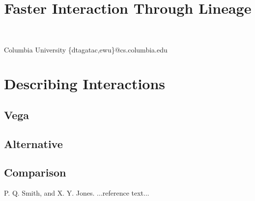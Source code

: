 \documentclass{sigplanconf}
\begin{document}
\setlength{\pdfpageheight}{\paperheight}
\setlength{\pdfpagewidth}{\paperwidth}


\title{Faster Interaction Through Lineage}

           {Columbia University}
           {\{dtagatac,ewu\}@cs.columbia.edu}

\maketitle



\section{Describing Interactions}
\subsection{Vega}
\subsection{Alternative}
\subsection{Comparison}


\begin{thebibliography}{}
\softraggedright
{}
P. Q. Smith, and X. Y. Jones. ...reference text...
\end{thebibliography}
\end{document}
